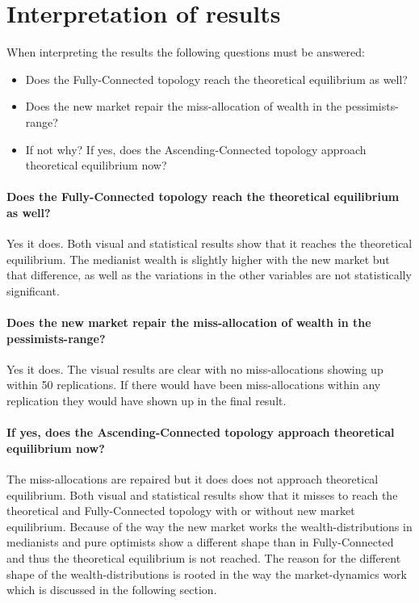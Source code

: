 \documentclass[Bachelorarbeit.tex]{subfiles}
\begin{document}
\section{Interpretation of results}
When interpreting the results the following questions must be answered:

\begin{itemize}
\item Does the Fully-Connected topology reach the theoretical equilibrium as well?
\item Does the new market repair the miss-allocation of wealth in the pessimists-range?
\item If not why? If yes, does the Ascending-Connected topology approach theoretical equilibrium now?
\end{itemize}

\paragraph{Does the Fully-Connected topology reach the theoretical equilibrium as well?}
Yes it does. Both visual and statistical results show that it reaches the theoretical equilibrium. The medianist wealth is slightly higher with the new market but that difference, as well as the variations in the other variables are not statistically significant.

\paragraph{Does the new market repair the miss-allocation of wealth in the pessimists-range?}
Yes it does. The visual results are clear with no miss-allocations showing up within 50 replications. If there would have been miss-allocations within any replication they would have shown up in the final result.

\paragraph{If yes, does the Ascending-Connected topology approach theoretical equilibrium now?}
The miss-allocations are repaired but it does does not approach theoretical equilibrium. Both visual and statistical results show that it misses to reach the theoretical and Fully-Connected topology with or without new market equilibrium. Because of the way the new market works the wealth-distributions in medianists and pure optimists show a different shape than in Fully-Connected and thus the theoretical equilibrium is not reached. The reason for the different shape of the wealth-distributions is rooted in the way the market-dynamics work which is discussed in the following section.
\end{document}
